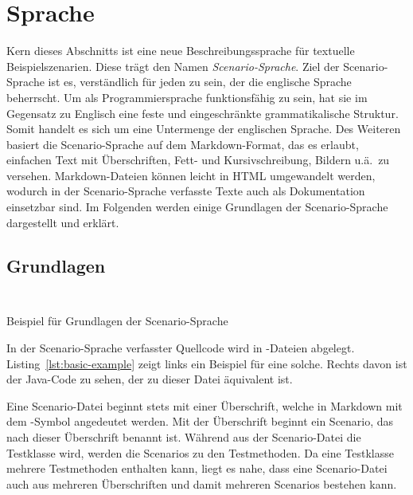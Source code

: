 \section{Sprache}\label{sec:language}

Kern dieses Abschnitts ist eine neue Beschreibungssprache für textuelle Beispielszenarien.
Diese trägt den Namen \emph{Scenario-Sprache}.
Ziel der Scenario-Sprache ist es, verständlich für jeden zu sein, der die englische Sprache beherrscht.
Um als Programmiersprache funktionsfähig zu sein, hat sie im Gegensatz zu Englisch eine feste und eingeschränkte grammatikalische Struktur.
Somit handelt es sich um eine Untermenge der englischen Sprache.
Des Weiteren basiert die Scenario-Sprache auf dem Markdown-Format,
das es erlaubt, einfachen Text mit Überschriften, Fett- und Kursivschreibung, Bildern u.ä.\ zu versehen.
Markdown-Dateien können leicht in HTML umgewandelt werden,
wodurch in der Scenario-Sprache verfasste Texte auch als Dokumentation einsetzbar sind.
Im Folgenden werden einige Grundlagen der Scenario-Sprache dargestellt und erklärt.

\subsection{Grundlagen}\label{subsec:basics}

\begin{listing}[htp]
    \begin{minipage}{0.45\textwidth}
        \centering
        \inputminted{md}{chapter/fulib-scenarios/scenarios/Basic.md}
    \end{minipage}
    \hspace{0.05\textwidth}
    \begin{minipage}{0.45\textwidth}
        \centering
        \inputminted{java}{chapter/fulib-scenarios/java/BasicTest.java}
    \end{minipage}
    \caption{Beispiel für Grundlagen der Scenario-Sprache}
    \label{lst:basic-example}
\end{listing}

In der Scenario-Sprache verfasster Quellcode wird in -Dateien abgelegt.
Listing~\ref{lst:basic-example} zeigt links ein Beispiel für eine solche.
Rechts davon ist der Java-Code zu sehen, der zu dieser Datei äquivalent ist.

Eine Scenario-Datei beginnt stets mit einer Überschrift, welche in Markdown mit dem \mdcode{#}-Symbol angedeutet werden.
Mit der Überschrift beginnt ein Scenario, das nach dieser Überschrift benannt ist.
Während aus der Scenario-Datei die Testklasse wird, werden die Scenarios zu den Testmethoden.
Da eine Testklasse mehrere Testmethoden enthalten kann, liegt es nahe, dass eine Scenario-Datei auch aus mehreren Überschriften und damit mehreren Scenarios bestehen kann.

